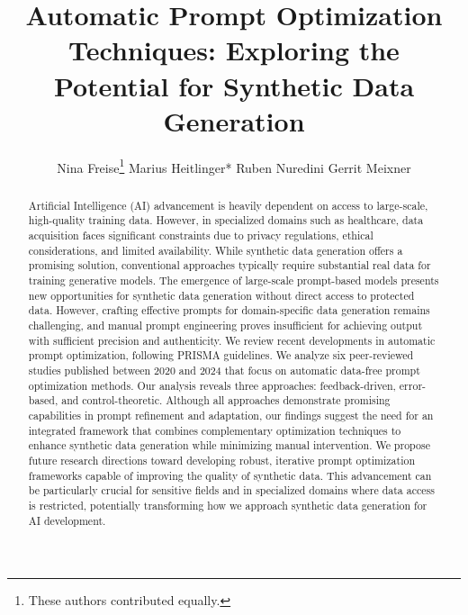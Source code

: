 \documentclass[runningheads]{llncs}
\begin{document}
\title{Automatic Prompt Optimization Techniques: \newline Exploring the Potential for Synthetic Data Generation}

\author{Nina Freise\thanks{These authors contributed equally.}
Marius Heitlinger*
Ruben Nuredini
Gerrit Meixner}

%
%



%
\maketitle              %
%
\begin{abstract}
Artificial Intelligence (AI) advancement is heavily dependent on access to large-scale, high-quality training data. However, in specialized domains such as healthcare, data acquisition faces significant constraints due to privacy regulations, ethical considerations, and limited availability. While synthetic data generation offers a promising solution, conventional approaches typically require substantial real data for training generative models. The emergence of large-scale prompt-based models presents new opportunities for synthetic data generation without direct access to protected data. However, crafting effective prompts for domain-specific data generation remains challenging, and manual prompt engineering proves insufficient for achieving output with sufficient precision and authenticity. We review recent developments in automatic prompt optimization, following PRISMA guidelines. We analyze six peer-reviewed studies published between 2020 and 2024 that focus on automatic data-free prompt optimization methods. Our analysis reveals three approaches: feedback-driven, error-based, and control-theoretic. Although all approaches demonstrate promising capabilities in prompt refinement and adaptation, our findings suggest the need for an integrated framework that combines complementary optimization techniques to enhance synthetic data generation while minimizing manual intervention. We propose future research directions toward developing robust, iterative prompt optimization frameworks capable of improving the quality of synthetic data. This advancement can be particularly crucial for sensitive fields and in specialized domains where data access is restricted, potentially transforming how we approach synthetic data generation for AI development.

\end{abstract}
%
%
%
\end{document}
